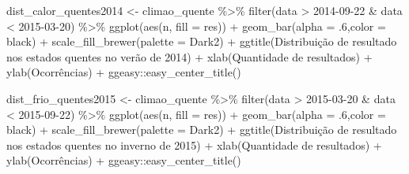 \documentclass[
]{article}
\newenvironment{Shaded}{\begin{snugshade}}{\end{snugshade}}
\newcommand{\AttributeTok}[1]{\textcolor[rgb]{0.77,0.63,0.00}{#1}}
\newcommand{\DecValTok}[1]{\textcolor[rgb]{0.00,0.00,0.81}{#1}}
\newcommand{\FunctionTok}[1]{\textcolor[rgb]{0.00,0.00,0.00}{#1}}
\newcommand{\NormalTok}[1]{#1}
\newcommand{\OtherTok}[1]{\textcolor[rgb]{0.56,0.35,0.01}{#1}}
\newcommand{\SpecialCharTok}[1]{\textcolor[rgb]{0.00,0.00,0.00}{#1}}
\newcommand{\StringTok}[1]{\textcolor[rgb]{0.31,0.60,0.02}{#1}}
\begin{document}
\begin{Shaded}
\begin{Highlighting}[]
\NormalTok{dist\_calor\_quentes2014 }\OtherTok{\textless{}{-}}\NormalTok{ climao\_quente }\SpecialCharTok{\%\textgreater{}\%} 
  \FunctionTok{filter}\NormalTok{(data }\SpecialCharTok{\textgreater{}} \StringTok{\textquotesingle{}2014{-}09{-}22\textquotesingle{}} \SpecialCharTok{\&}\NormalTok{ data }\SpecialCharTok{\textless{}} \StringTok{\textquotesingle{}2015{-}03{-}20\textquotesingle{}}\NormalTok{) }\SpecialCharTok{\%\textgreater{}\%}
  \FunctionTok{ggplot}\NormalTok{(}\FunctionTok{aes}\NormalTok{(n, }\AttributeTok{fill =}\NormalTok{ res)) }\SpecialCharTok{+} 
  \FunctionTok{geom\_bar}\NormalTok{(}\AttributeTok{alpha =}\NormalTok{ .}\DecValTok{6}\NormalTok{,}\AttributeTok{color =} \StringTok{\textquotesingle{}black\textquotesingle{}}\NormalTok{) }\SpecialCharTok{+} 
  \FunctionTok{scale\_fill\_brewer}\NormalTok{(}\AttributeTok{palette =} \StringTok{\textquotesingle{}Dark2\textquotesingle{}}\NormalTok{) }\SpecialCharTok{+}
  \FunctionTok{ggtitle}\NormalTok{(}\StringTok{\textquotesingle{}Distribuição de resultado nos estados quentes no verão de 2014\textquotesingle{}}\NormalTok{) }\SpecialCharTok{+}
  \FunctionTok{xlab}\NormalTok{(}\StringTok{\textquotesingle{}Quantidade de resultados\textquotesingle{}}\NormalTok{) }\SpecialCharTok{+} \FunctionTok{ylab}\NormalTok{(}\StringTok{\textquotesingle{}Ocorrências\textquotesingle{}}\NormalTok{) }\SpecialCharTok{+}
\NormalTok{  ggeasy}\SpecialCharTok{::}\FunctionTok{easy\_center\_title}\NormalTok{()}


\NormalTok{dist\_frio\_quentes2015 }\OtherTok{\textless{}{-}}\NormalTok{ climao\_quente }\SpecialCharTok{\%\textgreater{}\%} 
  \FunctionTok{filter}\NormalTok{(data }\SpecialCharTok{\textgreater{}} \StringTok{\textquotesingle{}2015{-}03{-}20\textquotesingle{}} \SpecialCharTok{\&}\NormalTok{ data }\SpecialCharTok{\textless{}} \StringTok{\textquotesingle{}2015{-}09{-}22\textquotesingle{}}\NormalTok{) }\SpecialCharTok{\%\textgreater{}\%}
  \FunctionTok{ggplot}\NormalTok{(}\FunctionTok{aes}\NormalTok{(n, }\AttributeTok{fill =}\NormalTok{ res)) }\SpecialCharTok{+} 
  \FunctionTok{geom\_bar}\NormalTok{(}\AttributeTok{alpha =}\NormalTok{ .}\DecValTok{6}\NormalTok{,}\AttributeTok{color =} \StringTok{\textquotesingle{}black\textquotesingle{}}\NormalTok{) }\SpecialCharTok{+} 
  \FunctionTok{scale\_fill\_brewer}\NormalTok{(}\AttributeTok{palette =} \StringTok{\textquotesingle{}Dark2\textquotesingle{}}\NormalTok{) }\SpecialCharTok{+}
  \FunctionTok{ggtitle}\NormalTok{(}\StringTok{\textquotesingle{}Distribuição de resultado nos estados quentes no inverno de 2015\textquotesingle{}}\NormalTok{) }\SpecialCharTok{+}
  \FunctionTok{xlab}\NormalTok{(}\StringTok{\textquotesingle{}Quantidade de resultados\textquotesingle{}}\NormalTok{) }\SpecialCharTok{+} \FunctionTok{ylab}\NormalTok{(}\StringTok{\textquotesingle{}Ocorrências\textquotesingle{}}\NormalTok{) }\SpecialCharTok{+}
\NormalTok{  ggeasy}\SpecialCharTok{::}\FunctionTok{easy\_center\_title}\NormalTok{()}


\end{Highlighting}
\end{Shaded}
\end{document}
